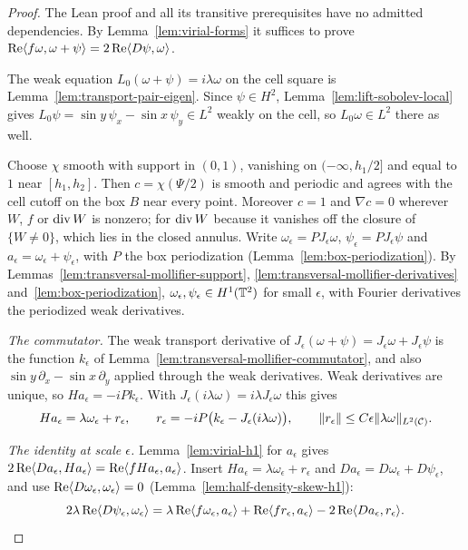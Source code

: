 \begin{proof}
\leanok
The Lean proof and all its transitive prerequisites have no admitted dependencies.
By Lemma~\ref{lem:virial-forms} it suffices to prove
$\operatorname{Re}\langle f\omega,\omega+\psi\rangle=2\operatorname{Re}\langle D\psi,\omega\rangle$.

The weak equation $L_0(\omega+\psi)=i\lambda\omega$ on the cell square is
Lemma~\ref{lem:transport-pair-eigen}. Since $\psi\in H^2$,
Lemma~\ref{lem:lift-sobolev-local} gives $L_0\psi=\sin y\,\psi_x-\sin x\,\psi_y\in L^2$
weakly on the cell, so $L_0\omega\in L^2$ there as well.

Choose $\chi$ smooth with support in $(0,1)$, vanishing on $(-\infty,h_1/2]$ and equal to
$1$ near $[h_1,h_2]$. Then $c=\chi(\Psi/2)$ is smooth and periodic and agrees with the cell
cutoff on the box $B$ near every point. Moreover $c=1$ and $\nabla c=0$ wherever $W$, $f$
or $\operatorname{div} W$ is nonzero; for $\operatorname{div} W$ because it vanishes off the closure of $\{W\ne0\}$,
which lies in the closed annulus. Write $\omega_\epsilon=PJ_\epsilon\omega$,
$\psi_\epsilon=PJ_\epsilon\psi$ and $a_\epsilon=\omega_\epsilon+\psi_\epsilon$, with $P$ the box
periodization (Lemma~\ref{lem:box-periodization}). By
Lemmas~\ref{lem:transversal-mollifier-support},
\ref{lem:transversal-mollifier-derivatives} and~\ref{lem:box-periodization},
$\omega_\epsilon,\psi_\epsilon\in H^1(\mathbb{T}^2)$ for small $\epsilon$, with Fourier derivatives
the periodized weak derivatives.

\emph{The commutator.} The weak transport derivative of
$J_\epsilon(\omega+\psi)=J_\epsilon\omega+J_\epsilon\psi$ is the function $k_\epsilon$ of
Lemma~\ref{lem:transversal-mollifier-commutator}, and also
$\sin y\,\partial_x-\sin x\,\partial_y$ applied through the weak derivatives. Weak
derivatives are unique, so $Ha_\epsilon=-iPk_\epsilon$. With
$J_\epsilon(i\lambda\omega)=i\lambda J_\epsilon\omega$ this gives
\[
  Ha_\epsilon=\lambda\omega_\epsilon+r_\epsilon,\qquad
  r_\epsilon=-iP\bigl(k_\epsilon-J_\epsilon(i\lambda\omega)\bigr),\qquad
  \|r_\epsilon\|\le C\epsilon\|\lambda\omega\|_{L^2(\mathcal{C})}.
\]

\emph{The identity at scale $\epsilon$.} Lemma~\ref{lem:virial-h1} for $a_\epsilon$ gives
$2\operatorname{Re}\langle Da_\epsilon,Ha_\epsilon\rangle=\operatorname{Re}\langle fHa_\epsilon,a_\epsilon\rangle$.
Insert $Ha_\epsilon=\lambda\omega_\epsilon+r_\epsilon$ and $Da_\epsilon=D\omega_\epsilon+D\psi_\epsilon$,
and use $\operatorname{Re}\langle D\omega_\epsilon,\omega_\epsilon\rangle=0$
(Lemma~\ref{lem:half-density-skew-h1}):
\[
  2\lambda\operatorname{Re}\langle D\psi_\epsilon,\omega_\epsilon\rangle
  =\lambda\operatorname{Re}\langle f\omega_\epsilon,a_\epsilon\rangle
    +\operatorname{Re}\langle fr_\epsilon,a_\epsilon\rangle
    -2\operatorname{Re}\langle Da_\epsilon,r_\epsilon\rangle.
\]


\end{proof}
